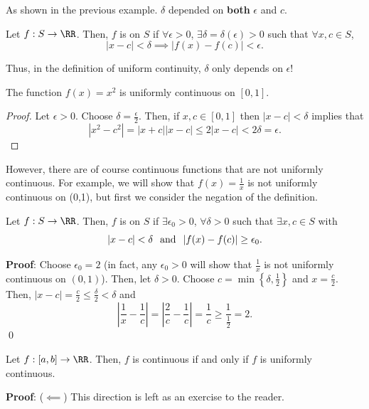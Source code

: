 As shown in the previous example. $\delta$ depended on \textbf{both} $\epsilon$ and $c$.

\begin{definition}
Let $f:S\to \RR$. Then, $f$ is  on $S$ if $\forall \epsilon >0$, $\exists \delta = \delta(\epsilon) >0$ such that $\forall x,c\in S$,
\[
|x-c|< \delta \implies |f(x) - f(c)|<\epsilon.
\]
\end{definition}
\begin{remark}
Thus, in the definition of uniform continuity, $\delta$ only depends on $\epsilon$!
\end{remark}

\begin{example}
The function $f(x) = x^2$ is uniformly continuous on $[0,1]$.
\end{example}
\begin{proof}
Let $\epsilon>0$. Choose $\delta = \frac{\epsilon}{2}$. Then, if $x,c\in [0,1]$ then $|x-c|< \delta$ implies that 
\[
|x^2-c^2| = |x+c||x-c| \leq 2|x-c| < 2\delta = \epsilon.
\]
\end{proof}

However, there are of course continuous functions that are not uniformly continuous. For example, we will show that $f(x) = \frac{1}{x}$ is not uniformly continuous on (0,1), but first we consider the negation of the definition.
\begin{negation}
Let $f:S\to \RR$. Then, $f$ is  on $S$ if $\exists \epsilon_0 >0$, $\forall \delta >0$ such that $\exists x,c\in S$ with
\[
|x-c|< \delta \hspace{.25cm} \text{and} \hspace{.25cm} |f(x) - f(c)|\geq \epsilon_0.
\]
\end{negation}
\textbf{Proof}: Choose $\epsilon_0 = 2$ (in fact, any $\epsilon_0 >0$ will show that $\frac{1}{x}$ is not uniformly continuous on $(0,1)$). Then, let $\delta >0$. Choose $c = \min\left\{\delta, \frac{1}{2}\right\}$ and $x = \frac{c}{2}$. Then, $|x-c| = \frac{c}{2}\leq \frac{\delta}{2} <\delta$ and 
\[
\left|\frac{1}{x} - \frac{1}{c}\right| = \left|\frac{2}{c} - \frac{1}{c}\right| = \frac{1}{c} \geq \frac{1}{\frac{1}{2}} = 2.
\] \qed 

\begin{theorem}
Let $f:[a,b]\to \RR$. Then, $f$ is continuous if and only if $f$ is uniformly continuous.
\end{theorem}
\textbf{Proof}: ($\impliedby$) This direction is left as an exercise to the reader.

